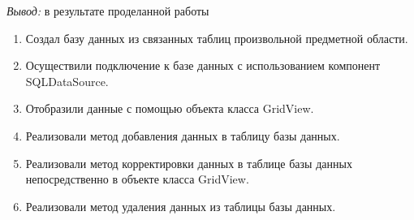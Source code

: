 \documentclass[pscyr]{hedlab}
\begin{document}
    \emph{Вывод:} в результате проделанной работы
    \begin{enumerate}
        \item Создал базу данных из связанных таблиц произвольной предметной области.
        \item Осуществили подключение к базе данных с использованием компонент SQLDataSource.
        \item Отобразили данные с помощью объекта класса GridView.
        \item Реализовали метод добавления данных в таблицу базы данных.
        \item Реализовали метод корректировки данных в таблице базы данных непосредственно в объекте 
        класса GridView.
        \item Реализовали метод удаления данных из таблицы базы данных.
    \end{enumerate}
\end{document}

